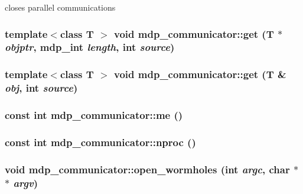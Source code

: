 closes parallel communications \hypertarget{classmdp__communicator_acfdb1f6ffcbbd80840edec86726b4877}{
\subsubsection[{get}]{\setlength{\rightskip}{0pt plus 5cm}template$<$class T $>$ void mdp\_\-communicator::get (T $\ast$ {\em objptr}, \/  {\bf mdp\_\-int} {\em length}, \/  int {\em source})}}
\label{classmdp__communicator_acfdb1f6ffcbbd80840edec86726b4877}
\hypertarget{classmdp__communicator_aeb5d6d81591246daa1014e53025a6960}{
\subsubsection[{get}]{\setlength{\rightskip}{0pt plus 5cm}template$<$class T $>$ void mdp\_\-communicator::get (T \& {\em obj}, \/  int {\em source})}}
\label{classmdp__communicator_aeb5d6d81591246daa1014e53025a6960}
\hypertarget{classmdp__communicator_ab4a002ef4c8bddc3133be4a1f9c6c3f8}{
\subsubsection[{me}]{\setlength{\rightskip}{0pt plus 5cm}const int mdp\_\-communicator::me ()}}
\label{classmdp__communicator_ab4a002ef4c8bddc3133be4a1f9c6c3f8}
\hypertarget{classmdp__communicator_af257b72bd642da879cb019b8cc6ebc6d}{
\subsubsection[{nproc}]{\setlength{\rightskip}{0pt plus 5cm}const int mdp\_\-communicator::nproc ()}}
\label{classmdp__communicator_af257b72bd642da879cb019b8cc6ebc6d}
\hypertarget{classmdp__communicator_af2c43869a689b8f1d020d4c4995b0cee}{
\subsubsection[{open\_\-wormholes}]{\setlength{\rightskip}{0pt plus 5cm}void mdp\_\-communicator::open\_\-wormholes (int {\em argc}, \/  char $\ast$$\ast$ {\em argv})}}
